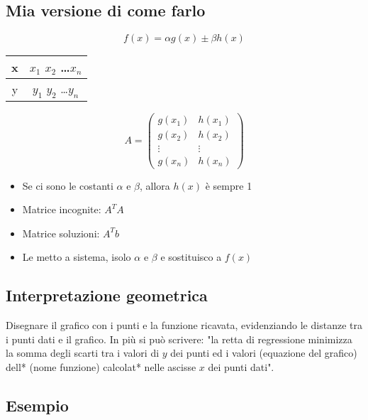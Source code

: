 \documentclass[10pt]{article}
\begin{document}
\subsection{Mia versione di come farlo}
\begin{equation*}
    f(x) = \alpha g(x)\pm \beta h(x)
\end{equation*}
\begin{tabular}{c | c}
    x & $x_{1}$ $x_{2}$ \ldots $x_{n}$\\
    \hline
    y & $y_{1}$ $y_{2}$ \ldots $y_{n}$
\end{tabular}
\begin{equation*}
    A =
    \begin{pmatrix}
        g(x_{1}) & h(x_{1}) \\
        g(x_{2}) & h(x_{2}) \\
        \vdots & \vdots \\
        g(x_{n}) & h(x_{n})
    \end{pmatrix}
\end{equation*}
\begin{itemize}
    \item Se ci sono le costanti $\alpha$ e $\beta$, allora $h(x)$ è sempre 1
    \item Matrice incognite: $A^{T}A$
    \item Matrice soluzioni: $A^{T}b$
    \item Le metto a sistema, isolo $\alpha$ e $\beta$ e sostituisco a $f(x)$
\end{itemize}
\subsection{Interpretazione geometrica}
Disegnare il grafico con i punti e la funzione ricavata, evidenziando le distanze tra i punti dati e il grafico. In più si può scrivere: "la retta di regressione minimizza la somma degli scarti tra i valori di $y$ dei punti ed i valori (equazione del grafico) dell* (nome funzione) calcolat* nelle ascisse $x$ dei punti dati".
\subsection{Esempio}
\end{document}
